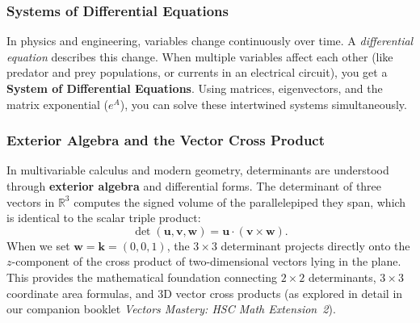 \subsubsection*{Systems of Differential Equations}
In physics and engineering, variables change continuously over time. A \emph{differential equation} describes this change. When multiple variables affect each other (like predator and prey populations, or currents in an electrical circuit), you get a \textbf{System of Differential Equations}. Using matrices, eigenvectors, and the matrix exponential ($e^A$), you can solve these intertwined systems simultaneously.

\subsubsection*{Exterior Algebra and the Vector Cross Product}
In multivariable calculus and modern geometry, determinants are understood through \textbf{exterior algebra} and differential forms. The determinant of three vectors in $\mathbb{R}^3$ computes the signed volume of the parallelepiped they span, which is identical to the scalar triple product:
\[
\det(\mathbf{u}, \mathbf{v}, \mathbf{w}) = \mathbf{u} \cdot (\mathbf{v} \times \mathbf{w}).
\]
When we set $\mathbf{w} = \mathbf{k} = (0, 0, 1)$, the $3 \times 3$ determinant projects directly onto the $z$-component of the cross product of two-dimensional vectors lying in the plane. This provides the mathematical foundation connecting $2 \times 2$ determinants, $3 \times 3$ coordinate area formulas, and 3D vector cross products (as explored in detail in our companion booklet \emph{Vectors Mastery: HSC Math Extension~2}).
